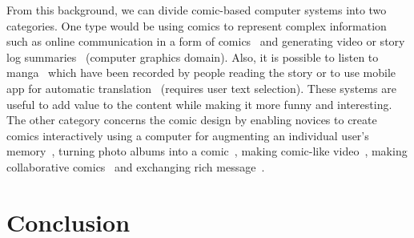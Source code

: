 From this background, we can divide comic-based computer systems into two categories.
One type would be using comics to represent complex information such as online communication in a form of comics~\cite{Kurlander1996} and generating video or story log summaries~\cite{Uchihashi1999Video,Alves2008So,Shamir2006Generating} (computer graphics domain).
Also, it is possible to listen to manga~\cite{Vomic} which have been recorded by people reading the story or to use mobile app for automatic translation~\cite{OCRMangaReader,Capture2Text} (requires user text selection).
These systems are useful to add value to the content while making it more funny and interesting.
The other category concerns the comic design by enabling novices to create comics  interactively using a computer for augmenting an individual user's memory~\cite{SumiSNM2002Comic}, turning photo albums into a comic~\cite{ComicLife3,Chu2013Optimized}, making comic-like video~\cite{Raulet2011Sketch}, making collaborative comics~\cite{Ricardo2009Calligraphic} and exchanging rich message~\cite{Salovaara2007Appropriation}.




\section{Conclusion}
\label{sec:sota:conclusion}




